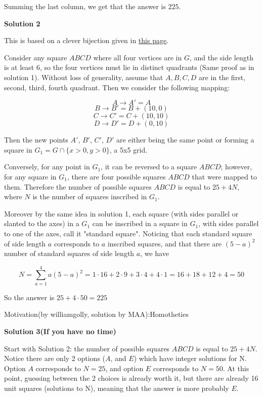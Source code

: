 \begin{enumerate}
Summing the last column, we get that the answer is $\boxed{225}$.

 



\textbf{Solution 2}

This is based on a clever bijection given in \href{https://artofproblemsolving.comhttp://web2.slc.qc.ca/sh/Contest/AMC12\_2009B-S.pdf}{this page}.

 Consider any square $ABCD$ where all four vertices are in $G$, and the side length is at least $6$, so the four vertices must lie in distinct quadrants (Same proof as in solution 1). Without loss of generality, assume that $A,B,C,D$ are in the first, second, third, fourth quadrant. Then we consider the following mapping:

 
 \[A \to A' = A\]
 \[B \to B' = B + (10,0)\]
 \[C \to C' = C + (10,10)\]
 \[D \to D' = D + (0,10)\]

 Then the new points $A'$, $B'$, $C'$, $D'$ are either being the same point or forming a square in $G_1 = G \cap \{ x>0, y>0 \}$, a 5x5 grid. 

 Conversely, for any point in $G_1$, it can be reversed to a square $ABCD$; however, for any square in $G_1$, there are four possible squares $ABCD$ that were mapped to them. Therefore the number of possible squares $ABCD$ is equal to $25 + 4N$, where $N$ is the number of squares inscribed in $G_1$.

 Moreover by the same idea in solution 1, each square (with sides parallel or slanted to the axes) in a $G_1$ can be inscribed in a square in $G_1$, with sides parallel to one of the axes, call it "standard square". Noticing that each standard square of side length $a$ corresponds to $a$ inscribed squares,  and that there are $(5-a)^2$ number of standard squares of side length $a$, we have

 
 \[N = \sum_{a=1}^{4} a(5-a)^2 = 1\cdot 16 + 2\cdot 9 + 3 \cdot 4 + 4 \cdot 1 = 16+18+12+4=50\]

 So the answer is $25+4\cdot 50 = 225$

 Motivation(by williamgolly, solution by MAA):Homotheties

 



\textbf{Solution 3(If you have no time)}

Start with Solution 2: the number of possible squares $ABCD$ is equal to $25 + 4N$. Notice there are only 2 options ($A$, and $E$) which have integer solutions for N. Option $A$ corresponds to $N=25$, and option $E$ corresponds to $N=50$. At this point, guessing between the 2 choices is already worth it, but there are already 16 unit squares (solutions to N), meaning that the answer is more probably $E$.


\end{enumerate}
